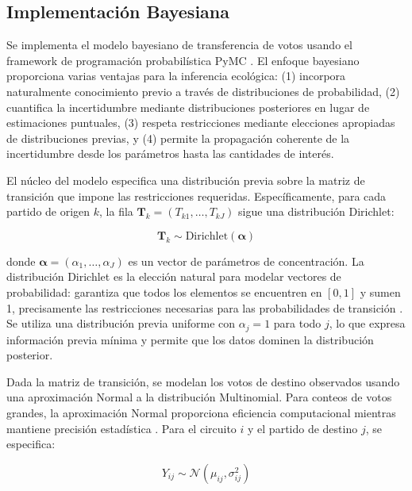 \subsection{Implementación Bayesiana}

Se implementa el modelo bayesiano de transferencia de votos usando el framework de programación probabilística PyMC \cite{abril2023pymc}. El enfoque bayesiano proporciona varias ventajas para la inferencia ecológica: (1) incorpora naturalmente conocimiento previo a través de distribuciones de probabilidad, (2) cuantifica la incertidumbre mediante distribuciones posteriores en lugar de estimaciones puntuales, (3) respeta restricciones mediante elecciones apropiadas de distribuciones previas, y (4) permite la propagación coherente de la incertidumbre desde los parámetros hasta las cantidades de interés.

El núcleo del modelo especifica una distribución previa sobre la matriz de transición que impone las restricciones requeridas. Específicamente, para cada partido de origen $k$, la fila $\mathbf{T}_k = (T_{k1}, \ldots, T_{kJ})$ sigue una distribución Dirichlet:

\begin{equation}
\label{eq:prior_dirichlet}
\mathbf{T}_k \sim \text{Dirichlet}(\boldsymbol{\alpha})
\end{equation}

donde $\boldsymbol{\alpha} = (\alpha_1, \ldots, \alpha_J)$ es un vector de parámetros de concentración. La distribución Dirichlet es la elección natural para modelar vectores de probabilidad: garantiza que todos los elementos se encuentren en $[0,1]$ y sumen 1, precisamente las restricciones necesarias para las probabilidades de transición \cite{gelman2013bayesian}. Se utiliza una distribución previa uniforme con $\alpha_j = 1$ para todo $j$, lo que expresa información previa mínima y permite que los datos dominen la distribución posterior.

Dada la matriz de transición, se modelan los votos de destino observados usando una aproximación Normal a la distribución Multinomial. Para conteos de votos grandes, la aproximación Normal proporciona eficiencia computacional mientras mantiene precisión estadística \cite{martin2021bayesian}. Para el circuito $i$ y el partido de destino $j$, se especifica:

\begin{equation}
\label{eq:verosimilitud}
Y_{ij} \sim \mathcal{N}\left(\mu_{ij}, \sigma_{ij}^2\right)
\end{equation}

